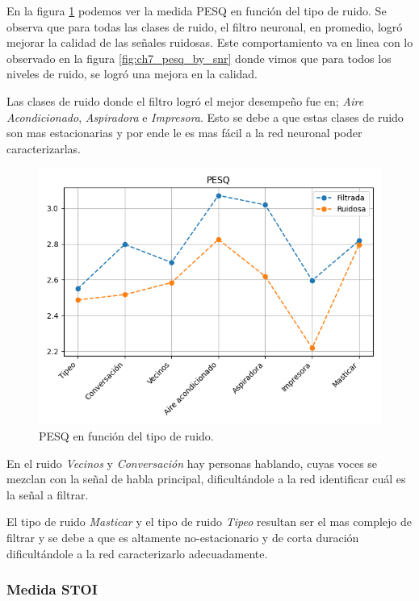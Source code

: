 En la figura \ref{fig:ch7_pesq_by_noise_type} podemos ver la medida PESQ en función del tipo de ruido. Se observa que para todas las clases de ruido, el filtro neuronal, en promedio, logró mejorar la calidad de las señales ruidosas. Este comportamiento va en linea con lo observado en la figura \ref{fig:ch7_pesq_by_snr} donde vimos que para todos los niveles de ruido, se logró una mejora en la calidad. 

Las clases de ruido donde el filtro logró el mejor desempeño fue en; \emph{Aire Acondicionado}, \emph{Aspiradora} e \emph{Impresora}. Esto se debe a que estas clases de ruido son mas estacionarias y por ende le es mas fácil a la red neuronal poder caracterizarlas.

\begin{figure}
	\centering
	\centerline{\includegraphics[scale=0.75]{images/ch7/pesq_by_noise_type.png}}
	\caption{PESQ en función del tipo de ruido.}
	\label{fig:ch7_pesq_by_noise_type}
\end{figure} 

En el ruido \emph{Vecinos} y \emph{Conversación} hay personas hablando, cuyas voces se mezclan con la señal de habla principal, dificultándole a la red identificar cuál es la señal a filtrar.

El tipo de ruido \emph{Masticar} y el tipo de ruido \emph{Tipeo} resultan ser el mas complejo de filtrar y se debe a que es altamente no-estacionario y de corta duración dificultándole a la red caracterizarlo adecuadamente. 

\subsubsection{Medida STOI}

